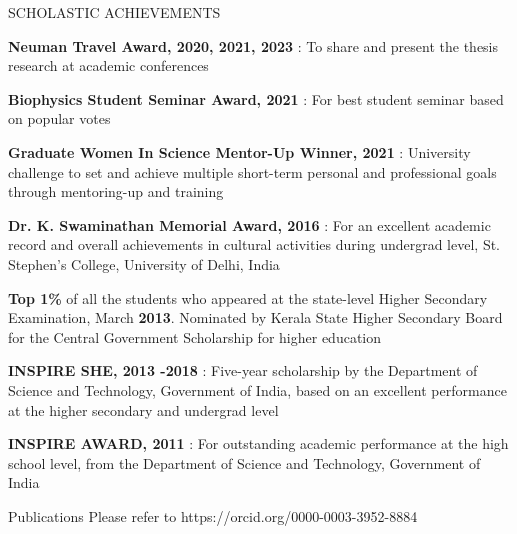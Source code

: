 \documentclass{resume} %
\begin{document}
\begin{rSection}{SCHOLASTIC ACHIEVEMENTS}
   \vspace{-1.25em}
   \item \textbf{Neuman Travel Award, 2020, 2021, 2023} : To share and present the thesis research at academic conferences
   \item \textbf{Biophysics Student Seminar Award, 2021} : For best student seminar based on popular votes
   \item \textbf{Graduate Women In Science Mentor-Up Winner, 2021} : University challenge to set and achieve multiple short-term personal and professional goals through mentoring-up and training
   \item \textbf{Dr. K. Swaminathan Memorial Award, 2016} : For an excellent academic record and overall achievements in cultural activities during undergrad level, St. Stephen's College, University of Delhi, India
   \item \textbf{Top 1\%} of all the students who appeared at the state-level Higher Secondary Examination, March \textbf{2013}. Nominated by Kerala State Higher Secondary Board for the Central Government Scholarship for higher education
   \item \textbf{INSPIRE SHE, 2013 -2018} : Five-year scholarship by the Department of Science and Technology, Government of India, based on an excellent performance at the higher secondary and undergrad level
   \item \textbf{INSPIRE AWARD, 2011} : For outstanding academic performance at the high school level, from the Department of Science and Technology, Government of India

\end{rSection}

\begin{rSection}{Publications}
   Please refer to https://orcid.org/0000-0003-3952-8884
\end{rSection}
\end{document}
